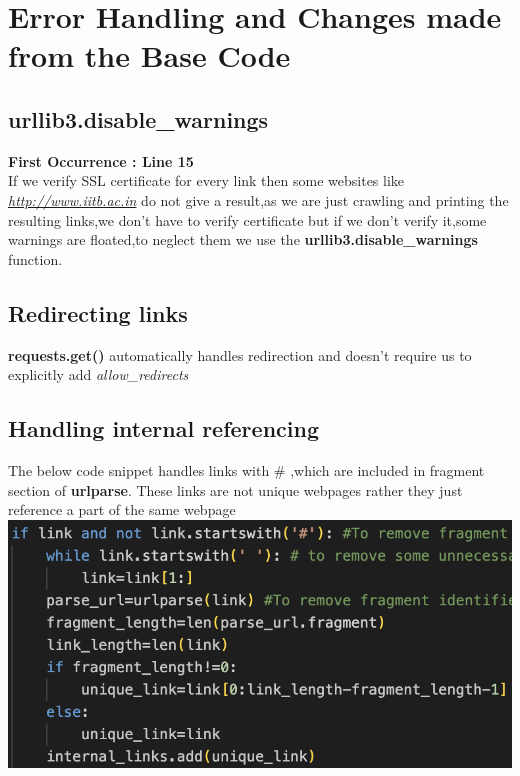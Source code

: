 \documentclass{article}
\begin{document}
\section{Error Handling and Changes made from the Base Code}
\subsection{urllib3.disable\_warnings}
\textbf{First Occurrence : Line 15}\\[0.4cm]
If we verify SSL certificate for every link then some websites like \textit{\underline{http://www.iitb.ac.in}} do not give a result,as we are just crawling and printing the resulting links,we don't have to verify certificate but if we don't verify it,some warnings are floated,to neglect them we use the \textbf{urllib3.disable\_warnings} function.
\subsection{Redirecting links}
\textbf{requests.get()} automatically handles redirection and doesn't require us to explicitly add \textit{allow\_redirects}
\subsection{Handling internal referencing}
The below code snippet handles links with \# ,which are included in fragment section of \textbf{urlparse}. These links are not unique webpages rather they just reference a part of the same webpage\\[1cm]
\includegraphics[width=14cm]{reference.png}\\
\cite{link1}
\cite{link2}\cite{link3}\cite{link4}\cite{link5}
\printbibliography
\end{document}

